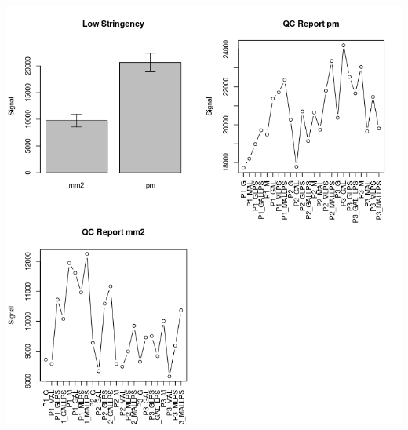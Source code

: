 \documentclass[a4paper,10pt]{article}
\begin{document}
\begin{center}
 \includegraphics[scale=0.5]{../../R/output/LowStringency.png}
\end{center}
\end{document}

